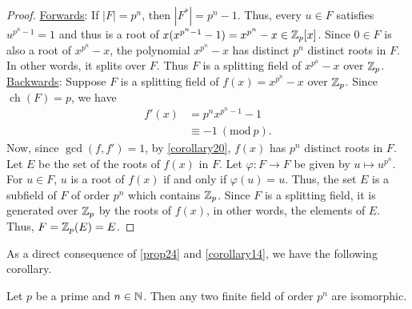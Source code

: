 \documentclass[11pt]{article}
\newcommand{\Mod}[1]{\ (\mathrm{mod}\ #1)}
\DeclareMathOperator{\ch}{ch}
\begin{document}
\begin{proof}
\underline{Forwards}: If $|F| = p^n$, then $|F^*|= p^n - 1$. Thus, every $u \in
F$ satisfies $u^{p^n-1} = 1$ and thus is a root of $x(x^{p^n-1} - 1) =
x^{p^n} - x \in \mathbb{Z}_p[x]$. Since $0 \in F$ is also a root of $x^{p^n} - x$, the
polynomial $x^{p^n} - x$ has distinct $p^n$ distinct roots in $F$. In other
words, it splits over $F$. Thus $F$ is a splitting field of $x^{p^n} - x$ over
$\mathbb{Z}_p$.\\
\underline{Backwards}: Suppose $F$ is a splitting field of $f(x) = x^{p^n} - x$
over $\mathbb{Z}_p$. Since $\ch(F) = p$, we have
\begin{align*}
f'(x) &= p^nx^{p^n-1} - 1\\
&\equiv -1 \Mod{p}.
\end{align*}
Now, since $\gcd(f,f') = 1$, by \cref{corollary20}, $f(x)$ has $p^n$ distinct
roots in $F$. Let $E$ be the set of the roots of $f(x)$ in $F$. Let $\varphi:F
\to F$ be given by $u \mapsto u^{p^n}$. For $u \in F$, $u$ is a root of $f(x)$
if and only if $\varphi(u) = u$. Thus, the set $E$ is a subfield of $F$ of order
$p^n$ which contains $\mathbb{Z}_p$. Since $F$ is a splitting field, it is generated
over $\mathbb{Z}_p$ by the roots of $f(x)$, in other words, the elements of $E$. Thus,
$F = \mathbb{Z}_p(E) = E$.
\end{proof}
As a direct consequence of \cref{prop24} and \cref{corollary14}, we have the
following corollary.
\begin{corollary}[E. H. Moore]
Let $p$ be a prime and $n \in \mathbb{N}$. Then any two finite field of order $p^n$ are
isomorphic.
\label{corollary25}
\end{corollary}
\end{document}
